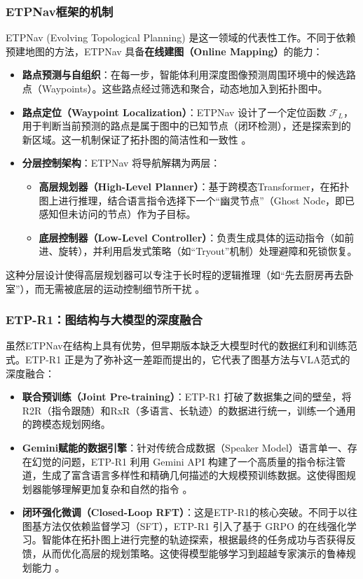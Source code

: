 \subsubsection{ETPNav框架的机制}
ETPNav (Evolving Topological Planning)   是这一领域的代表性工作。不同于依赖预建地图的方法，ETPNav 具备\textbf{在线建图（Online Mapping）}的能力：
\begin{itemize}
    \item \textbf{路点预测与自组织}：在每一步，智能体利用深度图像预测周围环境中的候选路点（Waypoints）。这些路点经过筛选和聚合，动态地加入到拓扑图中。
    \item \textbf{路点定位（Waypoint Localization）}：ETPNav 设计了一个定位函数 $\mathcal{F}_L$，用于判断当前预测的路点是属于图中的已知节点（闭环检测），还是探索到的新区域。这一机制保证了拓扑图的简洁性和一致性  。
    \item \textbf{分层控制架构}：ETPNav 将导航解耦为两层：
    \begin{itemize}
        \item \textbf{高层规划器（High-Level Planner）}：基于跨模态Transformer，在拓扑图上进行推理，结合语言指令选择下一个“幽灵节点”（Ghost Node，即已感知但未访问的节点）作为子目标。
        \item \textbf{底层控制器（Low-Level Controller）}：负责生成具体的运动指令（如前进、旋转），并利用启发式策略（如“Tryout”机制）处理避障和死锁恢复。
    \end{itemize}
\end{itemize}
这种分层设计使得高层规划器可以专注于长时程的逻辑推理（如“先去厨房再去卧室”），而无需被底层的运动控制细节所干扰  。

\subsubsection{ETP-R1：图结构与大模型的深度融合}
虽然ETPNav在结构上具有优势，但早期版本缺乏大模型时代的数据红利和训练范式。ETP-R1   正是为了弥补这一差距而提出的，它代表了图基方法与VLA范式的深度融合：
\begin{itemize}
    \item \textbf{联合预训练（Joint Pre-training）}：ETP-R1 打破了数据集之间的壁垒，将R2R（指令跟随）和RxR（多语言、长轨迹）的数据进行统一，训练一个通用的跨模态规划网络。
    \item \textbf{Gemini赋能的数据引擎}：针对传统合成数据（Speaker Model）语言单一、存在幻觉的问题，ETP-R1 利用 Gemini API 构建了一个高质量的指令标注管道，生成了富含语言多样性和精确几何描述的大规模预训练数据。这使得图规划器能够理解更加复杂和自然的指令  。
    \item \textbf{闭环强化微调（Closed-Loop RFT）}：这是ETP-R1的核心突破。不同于以往图基方法仅依赖监督学习（SFT），ETP-R1 引入了基于 GRPO 的在线强化学习。智能体在拓扑图上进行完整的轨迹探索，根据最终的任务成功与否获得反馈，从而优化高层的规划策略。这使得模型能够学习到超越专家演示的鲁棒规划能力  。
\end{itemize}

